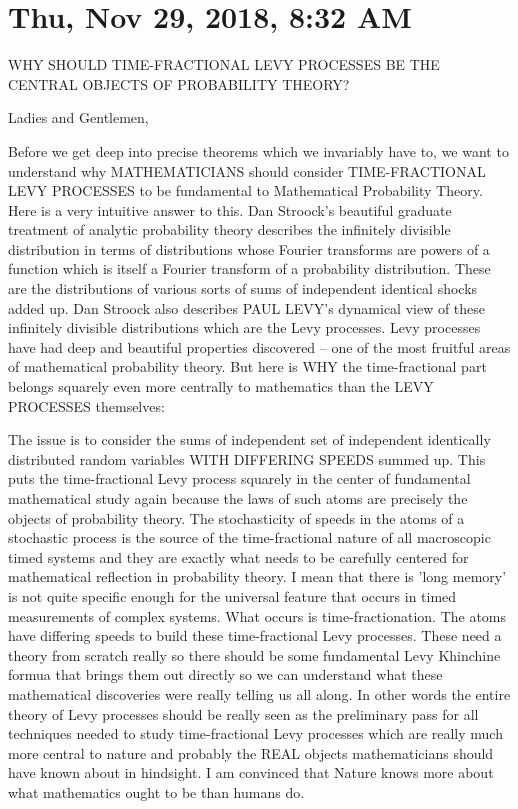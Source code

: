 \documentclass{amsart}
\begin{document}
\section{Thu, Nov 29, 2018, 8:32 AM}
WHY SHOULD TIME-FRACTIONAL LEVY PROCESSES BE THE CENTRAL OBJECTS OF PROBABILITY THEORY?

Ladies and Gentlemen,

Before we get deep into precise theorems which we invariably have to, we want to understand why MATHEMATICIANS should consider TIME-FRACTIONAL LEVY PROCESSES to be fundamental to Mathematical Probability Theory.  Here is a very intuitive answer to this.  Dan Stroock's beautiful graduate treatment of analytic probability theory describes the infinitely divisible distribution in terms of distributions whose Fourier transforms are powers of a function which is itself a Fourier transform of a probability distribution.  These are the distributions of various sorts of sums of independent identical shocks added up.  Dan Stroock also describes PAUL LEVY's dynamical view of these infinitely divisible distributions which are the Levy processes.  Levy processes have had deep and beautiful properties discovered -- one of the most fruitful areas of mathematical probability theory.  But here is WHY the time-fractional part belongs squarely even more centrally to mathematics than the LEVY PROCESSES themselves:

The issue is to consider the sums of independent set of independent identically distributed random variables WITH DIFFERING SPEEDS summed up.  This puts the time-fractional Levy process squarely in the center of fundamental mathematical study again because the laws of such atoms are precisely the objects of probability theory.  The stochasticity of speeds in the atoms of a stochastic process is the source of the time-fractional nature of all macroscopic timed systems and they are exactly what needs to be carefully centered for mathematical reflection in probability theory.  I mean that there is 'long memory' is not quite specific enough for the universal feature that occurs in timed measurements of complex systems.  What occurs is time-fractionation.  The atoms have differing speeds to build these time-fractional Levy processes.  These need a theory from scratch really so there should be some fundamental Levy Khinchine formua that brings them out directly so we can understand what these mathematical discoveries were really telling us all along.  In other words the entire theory of Levy processes should be really seen as the preliminary pass for all techniques needed to study time-fractional Levy processes which are really much more central to nature and probably the REAL objects mathematicians should have known about in hindsight.  I am convinced that Nature knows more about what mathematics ought to be than humans do.
\end{document}
